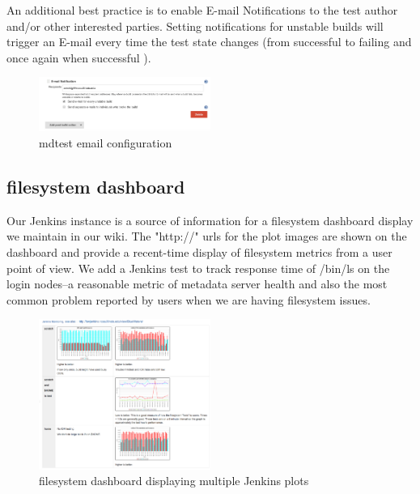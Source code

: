 \documentclass[10pt, conference, compsocconf]{IEEEtran}
\begin{document}
An additional best practice is to enable E-mail Notifications to the test author and/or other interested parties.  Setting notifications for unstable builds will trigger an E-mail every time the test state changes (from successful to failing and once again when successful ).
\begin{figure}[H]
\centering
\includegraphics[width=0.5\textwidth]{mdtest-config-email}
\caption{ mdtest email configuration }
\label{fig:mdtest-config-email}
\end{figure}

\subsection{filesystem dashboard}
Our Jenkins instance is a source of information for a filesystem dashboard display we maintain in our wiki.  The "http://" urls for the plot images are shown on the dashboard and provide a recent-time display of filesystem metrics from a user point of view.  We add a Jenkins test to track response time of /bin/ls on the login nodes--a reasonable metric of metadata server health and also the most common problem reported by users when we are having filesystem issues.
\begin{figure}[H]
\centering
\includegraphics[width=0.5\textwidth]{wiki-dashboard}
\caption{ filesystem dashboard displaying multiple Jenkins plots }
\label{fig:wiki-dashboard}
\end{figure}
\end{document}
